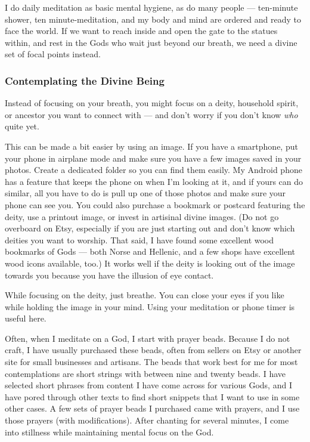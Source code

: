 \documentclass[
]{book}
\begin{document}
I do daily meditation as basic mental hygiene, as do many people --- ten-minute shower, ten minute-meditation, and my body and mind are ordered and ready to face the world. If we want to reach inside and open the gate to the statues within, and rest in the Gods who wait just beyond our breath, we need a divine set of focal points instead.

\hypertarget{contemplating-the-divine-being}{%
\subsubsection{Contemplating the Divine Being}\label{contemplating-the-divine-being}}

Instead of focusing on your breath, you might focus on a deity, household spirit, or ancestor you want to connect with --- and don't worry if you don't know \emph{who} quite yet.

This can be made a bit easier by using an image. If you have a smartphone, put your phone in airplane mode and make sure you have a few images saved in your photos. Create a dedicated folder so you can find them easily. My Android phone has a feature that keeps the phone on when I'm looking at it, and if yours can do similar, all you have to do is pull up one of those photos and make sure your phone can see you. You could also purchase a bookmark or postcard featuring the deity, use a printout image, or invest in artisinal divine images. (Do not go overboard on Etsy, especially if you are just starting out and don't know which deities you want to worship. That said, I have found some excellent wood bookmarks of Gods --- both Norse and Hellenic, and a few shops have excellent wood icons available, too.) It works well if the deity is looking out of the image towards you because you have the illusion of eye contact.

While focusing on the deity, just breathe. You can close your eyes if you like while holding the image in your mind. Using your meditation or phone timer is useful here.

Often, when I meditate on a God, I start with prayer beads. Because I do not craft, I have usually purchased these beads, often from sellers on Etsy or another site for small businesses and artisans. The beads that work best for me for most contemplations are short strings with between nine and twenty beads. I have selected short phrases from content I have come across for various Gods, and I have pored through other texts to find short snippets that I want to use in some other cases. A few sets of prayer beads I purchased came with prayers, and I use those prayers (with modifications). After chanting for several minutes, I come into stillness while maintaining mental focus on the God.
\end{document}
